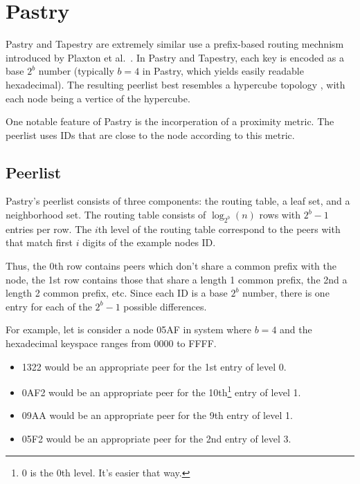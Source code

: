 \documentclass[10pt,letterpaper,twoside]{report}
\begin{document}
\section{Pastry}

Pastry \cite{pastry} and Tapestry \cite{tapestry} are extremely similar use a prefix-based routing mechnism introduced by Plaxton et al.\ \cite{plaxton1999accessing}.
In Pastry and Tapestry, each key is encoded as a base $ 2^{b} $ number (typically $b=4$ in Pastry, which yields easily readable hexadecimal).
The resulting peerlist best resembles a hypercube topology \cite{induced}, with each node being a vertice of the hypercube.

One notable feature of Pastry is the incorperation of a proximity metric.
The peerlist uses IDs that are close to the node according to this metric.

\subsection*{Peerlist}
Pastry's peerlist consists of three components: the routing table, a leaf set, and a neighborhood set.  
The routing table consists of $\log_{2^{b}}(n)$ rows with $2^{b} -1 $ entries per row. 
The $i$th level of the routing table correspond to the peers with that match first $i$ digits of the example nodes ID.

Thus, the 0th row contains peers which don't share a common prefix with the node, the 1st row contains those that share a length 1 common prefix, the 2nd a length 2 common prefix, etc.  
Since each ID is a base $2^b$ number, there is one entry for each of the $2^{b} -1 $ possible differences.   

For example, let is consider a node 05AF in system where $b = 4$ and the hexadecimal keyspace ranges from $0000$ to FFFF.
\begin{itemize}
    \item 1322 would be an appropriate peer for the 1st entry of level 0.
    \item 0AF2 would be an appropriate peer for the 10th\footnote{0 is the 0th level.  It's easier that way.} entry of level 1.
    \item 09AA would be an appropriate peer for the 9th entry of level 1.	
    \item 05F2 would be an appropriate peer for the 2nd entry of level 3.
\end{itemize}
\end{document}
